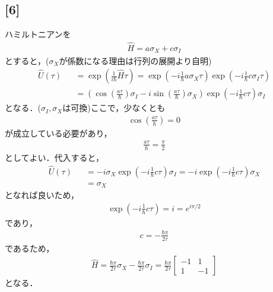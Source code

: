 \documentclass[12pt,dvipdfmx]{jsarticle}
\begin{document}
\subsection*{\large{[6]}}
ハミルトニアンを
\begin{eqnarray}
  \hat{H} = a\sigma_X+ c\sigma_I
\end{eqnarray}
とすると，($\sigma_X$が係数になる理由は行列の展開より自明)
\begin{eqnarray}
  \hat{U}(\tau) &&= \exp\left( \frac{1}{i\hbar}\hat{H}\tau \right) = \exp\left( -i\frac{1}{\hbar}a\sigma_X\tau \right)\exp\left( -i\frac{1}{\hbar}c\sigma_I\tau \right) \\
  &&= \left(\cos\left( \frac{a\tau}{\hbar} \right)\sigma_I -i\sin\left( \frac{a\tau}{\hbar} \right)\sigma_X\right)\exp\left( -i\frac{1}{\hbar}c\tau \right)\sigma_I
\end{eqnarray}
となる．($\sigma_I,\sigma_X$は可換)ここで，少なくとも
\begin{eqnarray}
  \cos\left( \frac{a\tau}{\hbar} \right) =0
\end{eqnarray}
が成立している必要があり，
\begin{eqnarray}
  \frac{a\tau}{\hbar} = \frac{\pi}{2}
\end{eqnarray}
としてよい．代入すると，
\begin{eqnarray}
  \hat{U}(\tau) &&= -i\sigma_X \exp\left( -i\frac{1}{\hbar}c\tau \right)\sigma_I = -i\exp\left( -i\frac{1}{\hbar}c\tau \right)\sigma_X\\
  &&= \sigma_X
\end{eqnarray}
となれば良いため，
\begin{eqnarray}
  \exp\left( -i\frac{1}{\hbar}c\tau \right) = i = e^{i\pi/2}
\end{eqnarray}
であり，
\begin{eqnarray}
  c = -\frac{\hbar\pi}{2\tau}
\end{eqnarray}
であるため，
\begin{eqnarray}
  \hat{H} = \frac{\hbar\pi}{2\tau}\sigma_X -\frac{\hbar\pi}{2\tau}\sigma_I = \frac{\hbar\pi}{2\tau}
  \begin{bmatrix}
    -1 & 1\\
    1 & -1
  \end{bmatrix}
\end{eqnarray}
となる．
\end{document}
